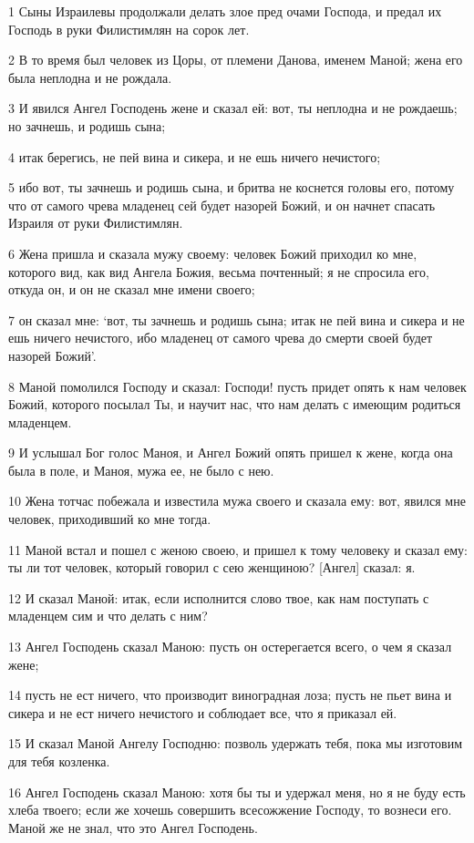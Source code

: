 \par 1 Сыны Израилевы продолжали делать злое пред очами Господа, и предал их Господь в руки Филистимлян на сорок лет.
\par 2 В то время был человек из Цоры, от племени Данова, именем Маной; жена его была неплодна и не рождала.
\par 3 И явился Ангел Господень жене и сказал ей: вот, ты неплодна и не рождаешь; но зачнешь, и родишь сына;
\par 4 итак берегись, не пей вина и сикера, и не ешь ничего нечистого;
\par 5 ибо вот, ты зачнешь и родишь сына, и бритва не коснется головы его, потому что от самого чрева младенец сей будет назорей Божий, и он начнет спасать Израиля от руки Филистимлян.
\par 6 Жена пришла и сказала мужу своему: человек Божий приходил ко мне, которого вид, как вид Ангела Божия, весьма почтенный; я не спросила его, откуда он, и он не сказал мне имени своего;
\par 7 он сказал мне: `вот, ты зачнешь и родишь сына; итак не пей вина и сикера и не ешь ничего нечистого, ибо младенец от самого чрева до смерти своей будет назорей Божий'.
\par 8 Маной помолился Господу и сказал: Господи! пусть придет опять к нам человек Божий, которого посылал Ты, и научит нас, что нам делать с имеющим родиться младенцем.
\par 9 И услышал Бог голос Маноя, и Ангел Божий опять пришел к жене, когда она была в поле, и Маноя, мужа ее, не было с нею.
\par 10 Жена тотчас побежала и известила мужа своего и сказала ему: вот, явился мне человек, приходивший ко мне тогда.
\par 11 Маной встал и пошел с женою своею, и пришел к тому человеку и сказал ему: ты ли тот человек, который говорил с сею женщиною? [Ангел] сказал: я.
\par 12 И сказал Маной: итак, если исполнится слово твое, как нам поступать с младенцем сим и что делать с ним?
\par 13 Ангел Господень сказал Маною: пусть он остерегается всего, о чем я сказал жене;
\par 14 пусть не ест ничего, что производит виноградная лоза; пусть не пьет вина и сикера и не ест ничего нечистого и соблюдает все, что я приказал ей.
\par 15 И сказал Маной Ангелу Господню: позволь удержать тебя, пока мы изготовим для тебя козленка.
\par 16 Ангел Господень сказал Маною: хотя бы ты и удержал меня, но я не буду есть хлеба твоего; если же хочешь совершить всесожжение Господу, то вознеси его. Маной же не знал, что это Ангел Господень.
